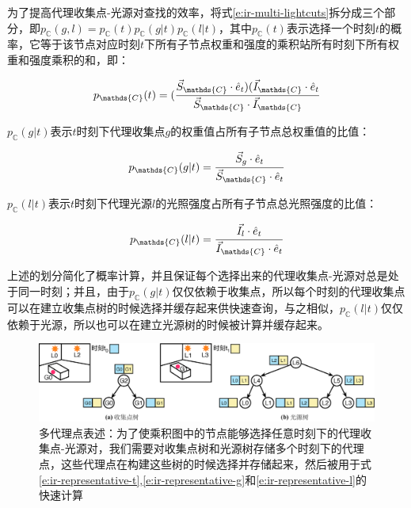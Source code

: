 为了提高代理收集点-光源对查找的效率，\cite{a:MultidimensionalLightcuts}将式\ref{e:ir-multi-lightcuts}拆分成三个部分，即$p_{\mathds{C}}(g,l)=p_{\mathds{C}}(t)p_{\mathds{C}}(g|t)p_{\mathds{C}}(l|t)$，其中$p_{\mathds{C}}(t)$表示选择一个时刻$t$的概率，它等于该节点对应时刻$t$下所有子节点权重和强度的乘积站所有时刻下所有权重和强度乘积的和，即：

\begin{equation}\label{e:ir-representative-t}
	p_{\mathds{C}}(t)=( \cfrac{\vec{S}_{\mathds{C}}\cdot\hat{e}_t)( \vec{I}_{\mathds{C}}\cdot\hat{e}_t}{\vec{S}_{\mathds{C}}\cdot\vec{I}_{\mathds{C}}}
\end{equation}

\noindent $p_{\mathds{C}}(g|t)$表示$t$时刻下代理收集点$g$的权重值占所有子节点总权重值的比值：

\begin{equation}\label{e:ir-representative-g}
	p_{\mathds{C}}(g|t)= \cfrac{\vec{S}_g\cdot\hat{e}_t}{\vec{S}_{\mathds{C}}\cdot\hat{e}_t}
\end{equation}

\noindent $p_{\mathds{C}}(l|t)$表示$t$时刻下代理光源$l$的光照强度占所有子节点总光照强度的比值：

\begin{equation}\label{e:ir-representative-l}
	p_{\mathds{C}}(l|t)= \cfrac{\vec{I}_l\cdot\hat{e}_t}{\vec{I}_{\mathds{C}}\cdot\hat{e}_t}
\end{equation}

\noindent 上述的划分简化了概率计算，并且保证每个选择出来的代理收集点-光源对总是处于同一时刻；并且，由于$p_{\mathds{C}}(g|t)$仅仅依赖于收集点，所以每个时刻的代理收集点可以在建立收集点树的时候选择并缓存起来供快速查询，与之相似，$p_{\mathds{C}}(l|t)$仅仅依赖于光源，所以也可以在建立光源树的时候被计算并缓存起来。

\begin{figure}
\begin{fullwidth}
	\includegraphics[width=1.0\thewidth]{figures/ir/multiple-representatives}
	\caption{多代理点表述：为了使乘积图中的节点能够选择任意时刻下的代理收集点-光源对，我们需要对收集点树和光源树存储多个时刻下的代理点，这些代理点在构建这些树的时候选择并存储起来，然后被用于式\ref{e:ir-representative-t},\ref{e:ir-representative-g}和\ref{e:ir-representative-l}的快速计算}
	\label{f:ir-multiple-representatives}
\end{fullwidth}
\end{figure}

